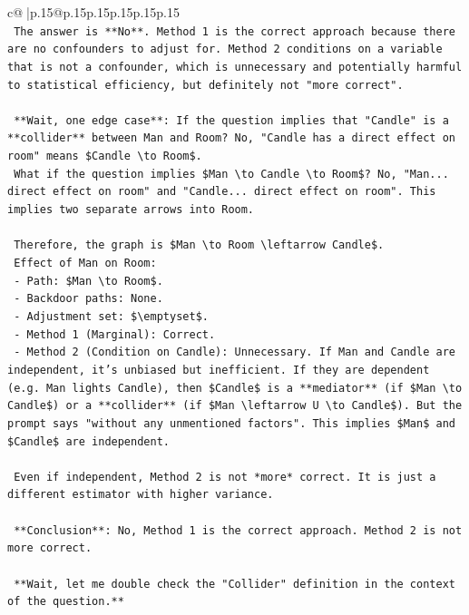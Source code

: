 \documentclass{article}
\begin{document}
{\begin{supertabular}{c@{$\;$}|p{.15\linewidth}@{}p{.15\linewidth}p{.15\linewidth}p{.15\linewidth}p{.15\linewidth}p{.15\linewidth}}
{{{\\ 
\texttt{    The answer is **No**. Method 1 is the correct approach because there are no confounders to adjust for. Method 2 conditions on a variable that is not a confounder, which is unnecessary and potentially harmful to statistical efficiency, but definitely not "more correct".} \\
\\ 
\texttt{    **Wait, one edge case**: If the question implies that "Candle" is a **collider** between Man and Room? No, "Candle has a direct effect on room" means \$Candle \textbackslash{}to Room\$.} \\
\texttt{    What if the question implies \$Man \textbackslash{}to Candle \textbackslash{}to Room\$? No, "Man... direct effect on room" and "Candle... direct effect on room". This implies two separate arrows into Room.} \\
\\ 
\texttt{    Therefore, the graph is \$Man \textbackslash{}to Room \textbackslash{}leftarrow Candle\$.} \\
\texttt{    Effect of Man on Room:} \\
\texttt{    {-} Path: \$Man \textbackslash{}to Room\$.} \\
\texttt{    {-} Backdoor paths: None.} \\
\texttt{    {-} Adjustment set: \$\textbackslash{}emptyset\$.} \\
\texttt{    {-} Method 1 (Marginal): Correct.} \\
\texttt{    {-} Method 2 (Condition on Candle): Unnecessary. If Man and Candle are independent, it's unbiased but inefficient. If they are dependent (e.g. Man lights Candle), then \$Candle\$ is a **mediator** (if \$Man \textbackslash{}to Candle\$) or a **collider** (if \$Man \textbackslash{}leftarrow U \textbackslash{}to Candle\$). But the prompt says "without any unmentioned factors". This implies \$Man\$ and \$Candle\$ are independent.} \\
\\ 
\texttt{    Even if independent, Method 2 is not *more* correct. It is just a different estimator with higher variance.} \\
\\ 
\texttt{    **Conclusion**: No, Method 1 is the correct approach. Method 2 is not more correct.} \\
\\ 
\texttt{    **Wait, let me double check the "Collider" definition in the context of the question.**} \\
}}}
\end{supertabular}}
\end{document}
